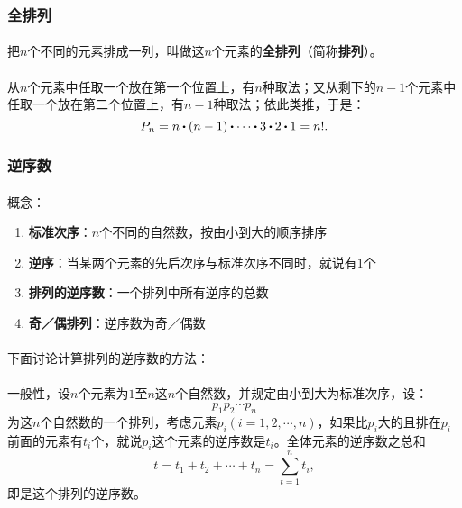 \subsubsection{全排列}
\paragraph{}
把$n$个不同的元素排成一列，叫做这$n$个元素的\textbf{全排列}（简称\textbf{排列}）。

\paragraph{}
从$n$个元素中任取一个放在第一个位置上，有$n$种取法；又从剩下的$n-1$个元素中任取一个放在第二个位置上，有$n-1$种取法；依此类推，于是：
\begin{equation*}
  P_n = n \bigcdot (n-1) \bigcdot \cdots \bigcdot 3 \bigcdot 2 \bigcdot 1 = n!.
\end{equation*}

\subsubsection{逆序数}
\paragraph{}
概念：
\begin{enumerate}
  \item \textbf{标准次序}：$n$个不同的自然数，按由小到大的顺序排序
  \item \textbf{逆序}：当某两个元素的先后次序与标准次序不同时，就说有$1$个
  \item \textbf{排列的逆序数}：一个排列中所有逆序的总数
  \item \textbf{奇／偶排列}：逆序数为奇／偶数
\end{enumerate}

\paragraph{}
下面讨论计算排列的逆序数的方法：

\paragraph{}
一般性，设$n$个元素为$1$至$n$这$n$个自然数，并规定由小到大为标准次序，设：
\begin{equation*}
  p_1p_2\cdots p_n
\end{equation*}
为这$n$个自然数的一个排列，考虑元素$p_i(i=1,2,\cdots,n)$，如果比$p_i$大的且排在$p_i$前面的元素有$t_i$个，就说$p_i$这个元素的逆序数是$t_i$。全体元素的逆序数之总和
\begin{equation*}
  t = t_1 + t_2 + \cdots + t_n = \sum_{t=1}^n t_i,
\end{equation*}
即是这个排列的逆序数。

